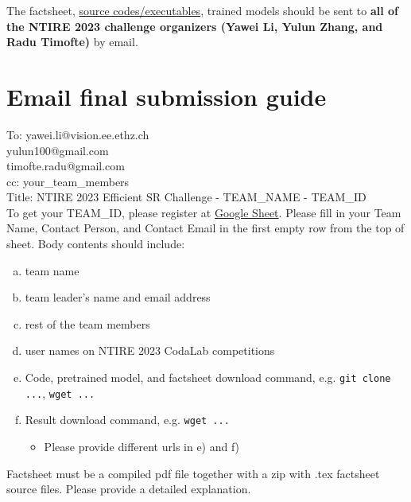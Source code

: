 \documentclass[10pt,twocolumn,letterpaper]{article}
\begin{document}
The factsheet, \href{https://github.com/ofsoundof/NTIRE2023_ESR}{source codes/executables}, trained models should be sent to \textbf{all of the NTIRE 2023 challenge organizers (Yawei Li, Yulun Zhang, and Radu Timofte)} by email.


\section{Email final submission guide}

\noindent To: {yawei.li@vision.ee.ethz.ch} \\ {yulun100@gmail.com} \\ {timofte.radu@gmail.com}\\
\noindent cc: your\_team\_members\\
Title: NTIRE 2023 Efficient SR Challenge - TEAM\_NAME - TEAM\_ID\\

To get your TEAM\_ID, please register at \href{https://docs.google.com/spreadsheets/d/1oekPThh5mq9qKax0hPZiQSHlqTjaoQa-IBfrQkwN7gk/edit?usp=sharing}{Google Sheet}. Please fill in your Team Name, Contact Person, and Contact Email in the first empty row from the top of sheet.
% 
Body contents should include: 

\begin{enumerate}[a)]
\item team name 

\item team leader's name and email address 

\item rest of the team members 

\item user names on NTIRE 2023 CodaLab competitions 

\item Code, pretrained model, and factsheet download command, e.g. \texttt{git clone ...}, \texttt{wget ...}

\item Result download command, e.g. \texttt{wget ...}
\begin{itemize}
    \item Please provide different urls in e) and f)
\end{itemize}
\end{enumerate}



\noindent Factsheet must be a compiled pdf file together with a zip with .tex factsheet source files. Please provide a detailed explanation.
\end{document}
